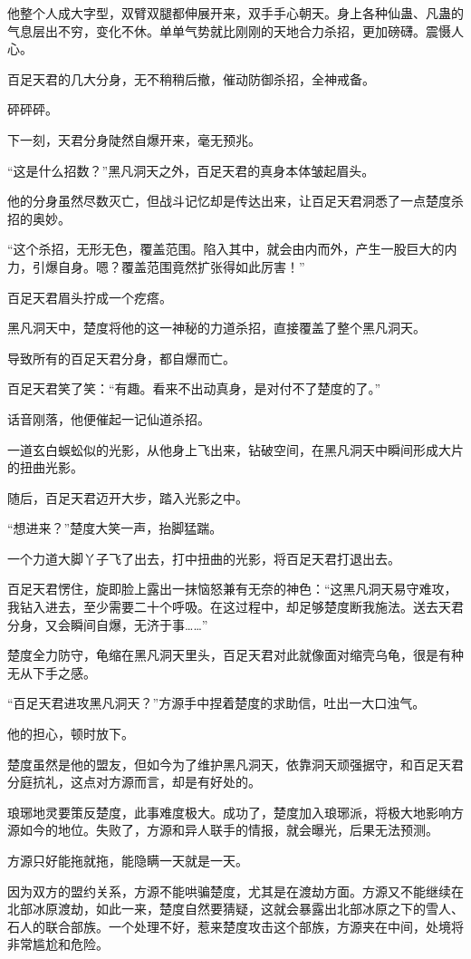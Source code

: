 \begin{this_body}
他整个人成大字型，双臂双腿都伸展开来，双手手心朝天。身上各种仙蛊、凡蛊的气息层出不穷，变化不休。单单气势就比刚刚的天地合力杀招，更加磅礴。震慑人心。

百足天君的几大分身，无不稍稍后撤，催动防御杀招，全神戒备。

砰砰砰。

下一刻，天君分身陡然自爆开来，毫无预兆。

“这是什么招数？”黑凡洞天之外，百足天君的真身本体皱起眉头。

他的分身虽然尽数灭亡，但战斗记忆却是传达出来，让百足天君洞悉了一点楚度杀招的奥妙。

“这个杀招，无形无色，覆盖范围。陷入其中，就会由内而外，产生一股巨大的内力，引爆自身。嗯？覆盖范围竟然扩张得如此厉害！”

百足天君眉头拧成一个疙瘩。

黑凡洞天中，楚度将他的这一神秘的力道杀招，直接覆盖了整个黑凡洞天。

导致所有的百足天君分身，都自爆而亡。

百足天君笑了笑：“有趣。看来不出动真身，是对付不了楚度的了。”

话音刚落，他便催起一记仙道杀招。

一道玄白蜈蚣似的光影，从他身上飞出来，钻破空间，在黑凡洞天中瞬间形成大片的扭曲光影。

随后，百足天君迈开大步，踏入光影之中。

“想进来？”楚度大笑一声，抬脚猛踹。

一个力道大脚丫子飞了出去，打中扭曲的光影，将百足天君打退出去。

百足天君愣住，旋即脸上露出一抹恼怒兼有无奈的神色：“这黑凡洞天易守难攻，我钻入进去，至少需要二十个呼吸。在这过程中，却足够楚度断我施法。送去天君分身，又会瞬间自爆，无济于事……”

楚度全力防守，龟缩在黑凡洞天里头，百足天君对此就像面对缩壳乌龟，很是有种无从下手之感。

“百足天君进攻黑凡洞天？”方源手中捏着楚度的求助信，吐出一大口浊气。

他的担心，顿时放下。

楚度虽然是他的盟友，但如今为了维护黑凡洞天，依靠洞天顽强据守，和百足天君分庭抗礼，这点对方源而言，却是有好处的。

琅琊地灵要策反楚度，此事难度极大。成功了，楚度加入琅琊派，将极大地影响方源如今的地位。失败了，方源和异人联手的情报，就会曝光，后果无法预测。

方源只好能拖就拖，能隐瞒一天就是一天。

因为双方的盟约关系，方源不能哄骗楚度，尤其是在渡劫方面。方源又不能继续在北部冰原渡劫，如此一来，楚度自然要猜疑，这就会暴露出北部冰原之下的雪人、石人的联合部族。一个处理不好，惹来楚度攻击这个部族，方源夹在中间，处境将非常尴尬和危险。


\end{this_body}
